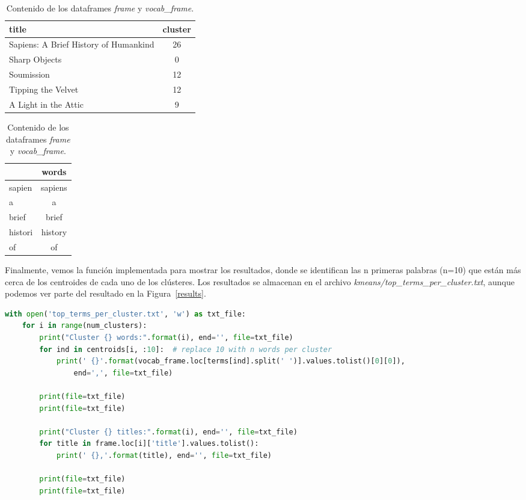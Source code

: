\documentclass{uimppracticas}
\begin{document}
\begin{table}[!htb]
	\centering
	\caption{Contenido de los dataframes \textit{frame} y \textit{vocab\_frame}.}
	\begin{minipage}{.6\linewidth}
		\centering
		\begin{tabular}{lc}
			\toprule
			title &  cluster \\
			\midrule
			Sapiens: A Brief History of Humankind & 26 \\
			Sharp Objects & 0 \\
			Soumission & 12 \\
			Tipping the Velvet & 12 \\
			A Light in the Attic & 9 \\
			\bottomrule
		\end{tabular}
	\end{minipage}%
	\begin{minipage}{.4\linewidth}
		\centering
		\begin{tabular}{lc}
			\toprule
			& words \\
			\midrule
			sapien & sapiens \\
			a & a \\
			brief & brief \\
			histori & history \\
			of & of \\
			\bottomrule
		\end{tabular}
	\end{minipage} 
\end{table}

Finalmente, vemos la función implementada para mostrar los resultados, donde se identifican las n primeras palabras (n=10) que están más cerca de los centroides de cada uno de los clústeres. Los resultados se almacenan en el archivo \textit{kmeans/top\_terms\_per\_cluster.txt}, aunque podemos ver parte del resultado en la Figura~\ref{results}. 

\begin{lstlisting}[language=python]
with open('top_terms_per_cluster.txt', 'w') as txt_file:
	for i in range(num_clusters):
		print("Cluster {} words:".format(i), end='', file=txt_file)
		for ind in centroids[i, :10]:  # replace 10 with n words per cluster
			print(' {}'.format(vocab_frame.loc[terms[ind].split(' ')].values.tolist()[0][0]), 
				end=',', file=txt_file)
	
		print(file=txt_file)
		print(file=txt_file)
	
		print("Cluster {} titles:".format(i), end='', file=txt_file)
		for title in frame.loc[i]['title'].values.tolist():
			print(' {},'.format(title), end='', file=txt_file)
	
		print(file=txt_file)
		print(file=txt_file)
\end{lstlisting}
\end{document}

